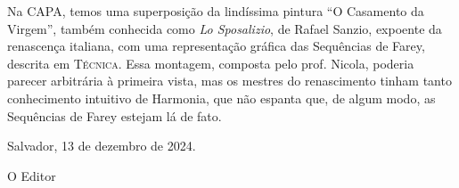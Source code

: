 \documentclass[onecolumn]{hipatia}
\begin{document}
\pagebreak

Na CAPA, temos uma superposição da lindíssima pintura ``O Casamento da Virgem'', também conhecida como \emph{Lo Sposalizio}, de Rafael Sanzio, expoente da renascença italiana, com uma representação
gráfica das Sequências de Farey, descrita em \textsc{Técnica}. 
Essa montagem, composta pelo prof. Nicola, poderia parecer arbitrária
 à primeira vista, mas os mestres do renascimento tinham
 tanto conhecimento intuitivo de Harmonia, que não espanta que,
 de algum modo, as Sequências de Farey estejam lá de fato.   

\vspace{1cm}

\hfill Salvador, 13 de dezembro de 2024.

\hfill O Editor
\end{document}
